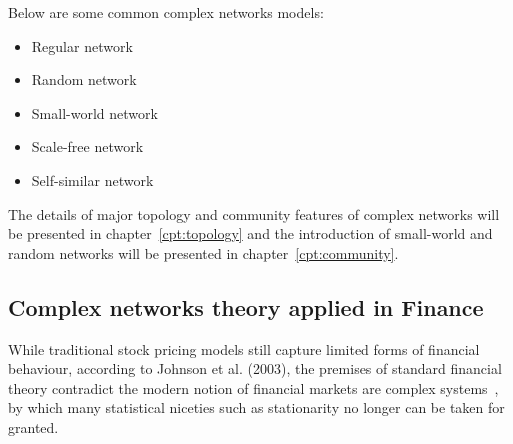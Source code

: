 Below are some common complex networks models:

\begin{itemize}
	\item Regular network
	\item Random network
	\item Small-world network
	\item Scale-free network
	\item Self-similar network
\end{itemize}

The details of major topology and community features of complex networks will be presented in chapter~\ref{cpt:topology} and the introduction of small-world and random networks will be presented in chapter~\ref{cpt:community}.

\subsection{Complex networks theory applied in Finance}
While traditional stock pricing models still capture limited forms of financial behaviour, according to Johnson et al. (2003), the premises of standard financial theory contradict the modern notion of financial markets are complex systems~\cite{financialcomplex}, by which many statistical niceties such as stationarity no longer can be taken for granted.

